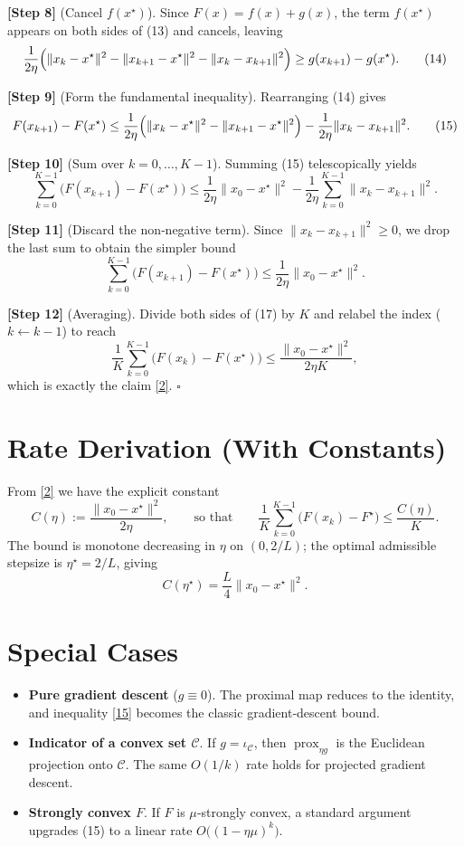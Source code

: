 \documentclass{article}
\newcommand{\prox}{\operatorname{prox}}
\begin{document}
\noindent\textbf{[Step 8]} (Cancel $f(x^{\star})$).  
Since $F(x)=f(x)+g(x)$, the term $f(x^{\star})$ appears on both sides of (13) and cancels, leaving
\[
\frac{1}{2\eta}\Bigl(\|x_{k}-x^{\star}\|^{2}
-\|x_{k+1}-x^{\star}\|^{2}
-\|x_{k}-x_{k+1}\|^{2}\Bigr)
\ge g(x_{k+1})-g(x^{\star}).
\tag{14}
\]

\noindent\textbf{[Step 9]} (Form the fundamental inequality).  
Rearranging (14) gives
\[
F(x_{k+1})-F(x^{\star})
\le \frac{1}{2\eta}\Bigl(\|x_{k}-x^{\star}\|^{2}
-\|x_{k+1}-x^{\star}\|^{2}\Bigr)
-\frac{1}{2\eta}\|x_{k}-x_{k+1}\|^{2}.
\tag{15}
\]

\noindent\textbf{[Step 10]} (Sum over $k=0,\dots,K-1$).  
Summing (15) telescopically yields
\[
\sum_{k=0}^{K-1}\bigl(F(x_{k+1})-F(x^{\star})\bigr)
\le \frac{1}{2\eta}\|x_{0}-x^{\star}\|^{2}
-\frac{1}{2\eta}\sum_{k=0}^{K-1}\|x_{k}-x_{k+1}\|^{2}.
\tag{16}
\]

\noindent\textbf{[Step 11]} (Discard the non‑negative term).  
Since $\|x_{k}-x_{k+1}\|^{2}\ge0$, we drop the last sum to obtain the simpler bound
\[
\sum_{k=0}^{K-1}\bigl(F(x_{k+1})-F(x^{\star})\bigr)
\le \frac{1}{2\eta}\|x_{0}-x^{\star}\|^{2}.
\tag{17}
\]

\noindent\textbf{[Step 12]} (Averaging).  
Divide both sides of (17) by $K$ and relabel the index ($k\gets k-1$) to reach
\[
\frac{1}{K}\sum_{k=0}^{K-1}\bigl(F(x_{k})-F(x^{\star})\bigr)
\le \frac{\|x_{0}-x^{\star}\|^{2}}{2\eta K},
\]
which is exactly the claim \eqref{2}.  $\square$

\section*{Rate Derivation (With Constants)}
From \eqref{2} we have the explicit constant
\[
C(\eta):=\frac{\|x_{0}-x^{\star}\|^{2}}{2\eta},
\qquad\text{so that}\qquad
\frac{1}{K}\sum_{k=0}^{K-1}\bigl(F(x_{k})-F^{\star}\bigr)\le\frac{C(\eta)}{K}.
\]
The bound is monotone decreasing in $\eta$ on $(0,2/L)$; the optimal admissible stepsize is $\eta^{\star}=2/L$, giving
\[
C(\eta^{\star})=\frac{L}{4}\|x_{0}-x^{\star}\|^{2}.
\]

\section*{Special Cases}
\begin{itemize}
\item \textbf{Pure gradient descent} ($g\equiv0$).  The proximal map reduces to the identity, and inequality \eqref{15} becomes the classic gradient‑descent bound.
\item \textbf{Indicator of a convex set $\mathcal{C}$}.  If $g=\iota_{\mathcal{C}}$, then $\prox_{\eta g}$ is the Euclidean projection onto $\mathcal{C}$.  The same $O(1/k)$ rate holds for projected gradient descent.
\item \textbf{Strongly convex $F$}.  If $F$ is $\mu$‑strongly convex, a standard argument upgrades (15) to a linear rate $O\bigl((1-\eta\mu)^{k}\bigr)$.
\end{itemize}
\end{document}
